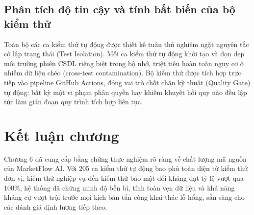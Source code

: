 \subsection{Phân tích độ tin cậy và tính bất biến của bộ kiểm thử}

Toàn bộ các ca kiểm thử tự động được thiết kế tuân thủ nghiêm ngặt nguyên tắc cô lập trạng thái (Test Isolation). Mỗi ca kiểm thử tự động khởi tạo và dọn dẹp môi trường phiên CSDL riêng biệt trong bộ nhớ, triệt tiêu hoàn toàn nguy cơ ô nhiễm dữ liệu chéo (cross-test contamination). Bộ kiểm thử được tích hợp trực tiếp vào pipeline GitHub Actions, đóng vai trò chốt chặn kỹ thuật (Quality Gate) tự động: bất kỳ một vi phạm phân quyền hay khiếm khuyết hồi quy nào đều lập tức làm gián đoạn quy trình tích hợp liên tục.

\section{Kết luận chương}

Chương 6 đã cung cấp bằng chứng thực nghiệm rõ ràng về chất lượng mã nguồn của MarketFlow AI. Với 205 ca kiểm thử tự động bao phủ toàn diện từ kiểm thử đơn vị, kiểm thử nghiệp vụ đến kiểm thử bảo mật đối kháng đạt tỷ lệ vượt qua 100\%, hệ thống đã chứng minh độ bền bỉ, tính toàn vẹn dữ liệu và khả năng kháng cự vượt trội trước mọi kịch bản tấn công khai thác lỗ hổng, sẵn sàng cho các đánh giá định lượng tiếp theo.
